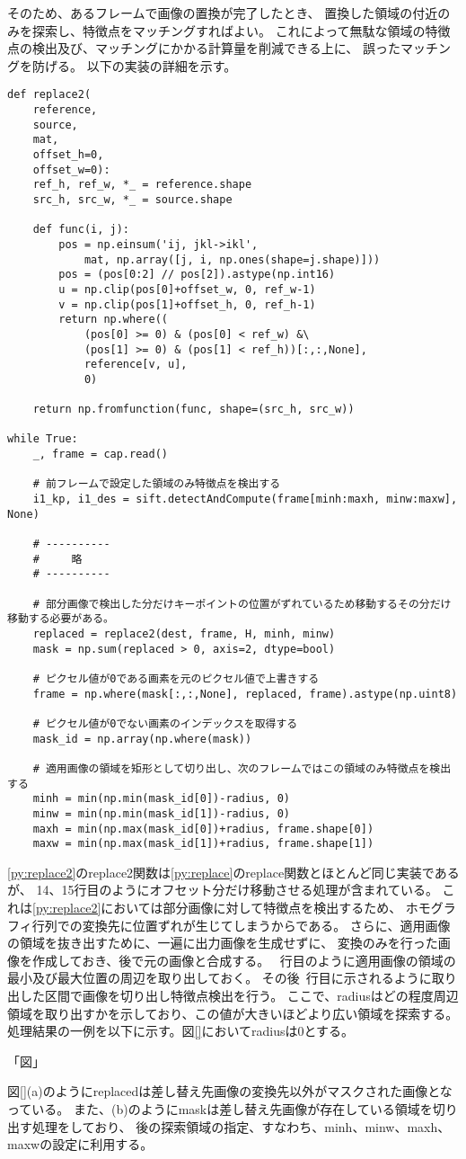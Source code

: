 そのため、あるフレームで画像の置換が完了したとき、
置換した領域の付近のみを探索し、特徴点をマッチングすればよい。
これによって無駄な領域の特徴点の検出及び、マッチングにかかる計算量を削減できる上に、
誤ったマッチングを防げる。
以下の実装の詳細を示す。

\begin{lstlisting}[caption=対応点マッチング, label=py:replace2]
def replace2(
    reference,
    source,
    mat,
    offset_h=0,
    offset_w=0):
    ref_h, ref_w, *_ = reference.shape
    src_h, src_w, *_ = source.shape

    def func(i, j):
        pos = np.einsum('ij, jkl->ikl',
            mat, np.array([j, i, np.ones(shape=j.shape)]))
        pos = (pos[0:2] // pos[2]).astype(np.int16)
        u = np.clip(pos[0]+offset_w, 0, ref_w-1)
        v = np.clip(pos[1]+offset_h, 0, ref_h-1)
        return np.where((
            (pos[0] >= 0) & (pos[0] < ref_w) &\
            (pos[1] >= 0) & (pos[1] < ref_h))[:,:,None],
            reference[v, u],
            0)

    return np.fromfunction(func, shape=(src_h, src_w))

while True:
    _, frame = cap.read()
    
    # 前フレームで設定した領域のみ特徴点を検出する
    i1_kp, i1_des = sift.detectAndCompute(frame[minh:maxh, minw:maxw], None)

    # ----------
    #     略    
    # ----------

    # 部分画像で検出した分だけキーポイントの位置がずれているため移動するその分だけ移動する必要がある。
    replaced = replace2(dest, frame, H, minh, minw)
    mask = np.sum(replaced > 0, axis=2, dtype=bool)

    # ピクセル値が0である画素を元のピクセル値で上書きする
    frame = np.where(mask[:,:,None], replaced, frame).astype(np.uint8)

    # ピクセル値が0でない画素のインデックスを取得する
    mask_id = np.array(np.where(mask))

    # 適用画像の領域を矩形として切り出し、次のフレームではこの領域のみ特徴点を検出する
    minh = min(np.min(mask_id[0])-radius, 0)
    minw = min(np.min(mask_id[1])-radius, 0)
    maxh = min(np.max(mask_id[0])+radius, frame.shape[0])
    maxw = min(np.max(mask_id[1])+radius, frame.shape[1])
\end{lstlisting}

\ref{py:replace2}のreplace2関数は\ref{py:replace}のreplace関数とほとんど同じ実装であるが、
14、15行目のようにオフセット分だけ移動させる処理が含まれている。
これは\ref{py:replace2}においては部分画像に対して特徴点を検出するため、
ホモグラフィ行列での変換先に位置ずれが生じてしまうからである。
さらに、適用画像の領域を抜き出すために、一遍に出力画像を生成せずに、
変換のみを行った画像を作成しておき、後で元の画像と合成する。
~行目のように適用画像の領域の最小及び最大位置の周辺を取り出しておく。
その後~行目に示されるように取り出した区間で画像を切り出し特徴点検出を行う。
ここで、radiusはどの程度周辺領域を取り出すかを示しており、この値が大きいほどより広い領域を探索する。
処理結果の一例を以下に示す。図\ref{}においてradiusは0とする。

「図」

図\ref{}(a)のようにreplacedは差し替え先画像の変換先以外がマスクされた画像となっている。
また、(b)のようにmaskは差し替え先画像が存在している領域を切り出す処理をしており、
後の探索領域の指定、すなわち、minh、minw、maxh、maxwの設定に利用する。


